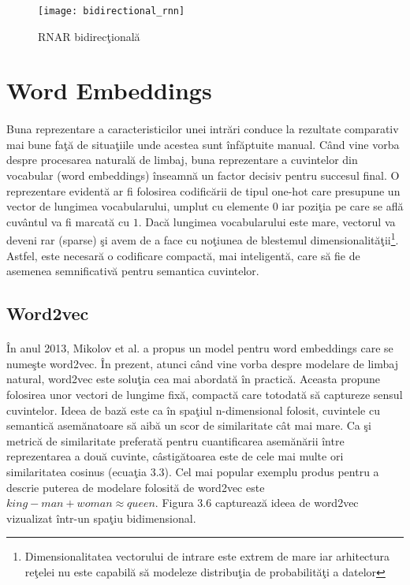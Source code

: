 \begin{figure}[H]
\centering
\texttt{[image: bidirectional\_rnn]}
\caption{RNAR bidirec\c tional\u a}
\end{figure} 

\section{Word Embeddings}

\paragraph{}
Buna reprezentare a caracteristicilor unei intr\u ari conduce la rezultate comparativ mai bune fa\c t\u a de situa\c tiile unde acestea sunt \^ inf\u aptuite manual. C\^ and vine vorba despre procesarea natural\u a de limbaj, buna reprezentare a cuvintelor din vocabular (word embeddings) \^ inseamn\u a un factor decisiv pentru succesul final. O reprezentare evident\u a ar fi folosirea codific\u arii de tipul one-hot care presupune un vector de lungimea vocabularului, umplut cu elemente \(0\) iar pozi\c tia pe care se afl\u a cuv\^ antul va fi marcat\u a cu \(1\). Dac\u a lungimea vocabularului este mare, vectorul va deveni rar (sparse) \c si avem de a face cu no\c tiunea de blestemul dimensionalit\u a\c tii\footnote{Dimensionalitatea vectorului de intrare este extrem de mare iar arhitectura re\c telei nu este capabil\u a s\u a modeleze distribu\c tia de probabilit\u a\c ti a datelor}. Astfel, este necesar\u a o codificare compact\u a, mai inteligent\u a, care s\u a fie de asemenea semnificativ\u a pentru semantica cuvintelor.

\subsection{Word2vec}

\paragraph{}
\^ In anul 2013, Mikolov et al. a propus un model pentru word embeddings care se nume\c ste word2vec. \^ In prezent, atunci c\^ and vine vorba despre modelare de limbaj natural, word2vec este solu\c tia cea mai abordat\u a \^ in practic\u a. Aceasta propune folosirea unor vectori de lungime fix\u a, compact\u a care totodat\u a s\u a captureze sensul cuvintelor. Ideea de baz\u a este ca \^ in spa\c tiul n-dimensional folosit, cuvintele cu semantic\u a asem\u anatoare s\u a aib\u a un scor de similaritate c\^at mai mare. Ca \c si metric\u a de similaritate preferat\u a pentru cuantificarea asem\u an\u arii \^ intre reprezentarea a dou\u a cuvinte, c\^ astig\u atoarea este de cele mai multe ori similaritatea cosinus (ecua\c tia 3.3). Cel mai popular exemplu produs pentru a descrie puterea de modelare folosit\u a de word2vec este \(king - man + woman \approx queen\). Figura 3.6 captureaz\u a ideea de word2vec vizualizat \^ intr-un spa\c tiu bidimensional.

